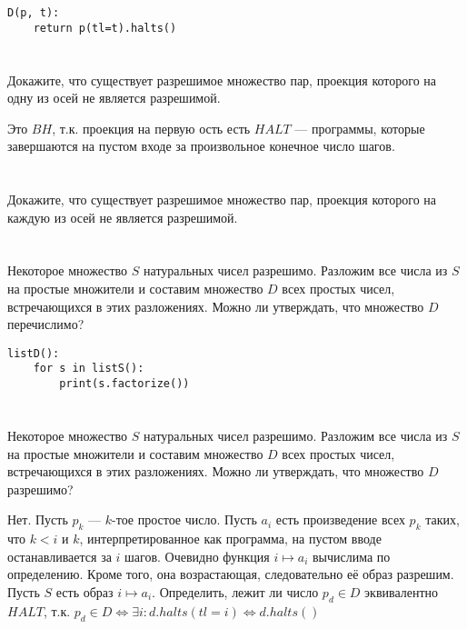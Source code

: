 \begin{verbatim}
D(p, t):
    return p(tl=t).halts()
\end{verbatim}

\section{}
Докажите, что существует разрешимое множество пар, проекция которого на одну из осей не является разрешимой.

Это \(BH\), т.к. проекция на первую ость есть \(HALT\) --- программы, которые завершаются на пустом входе за произвольное конечное число шагов.

\section{}
Докажите, что существует разрешимое множество пар, проекция которого на каждую из осей не является разрешимой.


\section{}
Некоторое множество $S$ натуральных чисел разрешимо. Разложим все числа из $S$ на простые множители и составим множество $D$ всех простых чисел, встречающихся в этих разложениях. Можно ли утверждать, что множество $D$ перечислимо?

\begin{verbatim}
listD():
    for s in listS():
        print(s.factorize())
\end{verbatim}

\section{}
Некоторое множество $S$ натуральных чисел разрешимо. Разложим все числа из $S$ на простые множители и составим множество $D$ всех простых чисел, встречающихся в этих разложениях. Можно ли утверждать, что множество $D$ разрешимо?

Нет. Пусть \(p_k\) --- \(k\)-тое простое число. Пусть \(a_i\) есть произведение всех \(p_k\) таких, что \(k < i\) и \(k\), интерпретированное как программа, на пустом вводе останавливается за \(i\) шагов. Очевидно функция \(i \mapsto a_i\) вычислима по определению. Кроме того, она возрастающая, следовательно её образ разрешим. Пусть \(S\) есть образ \(i \mapsto a_i\). Определить, лежит ли число \(p_d \in D\) эквивалентно \(HALT\), т.к. \(p_d \in D \Leftrightarrow \exists i : d.halts(tl = i) \Leftrightarrow d.halts()\)

